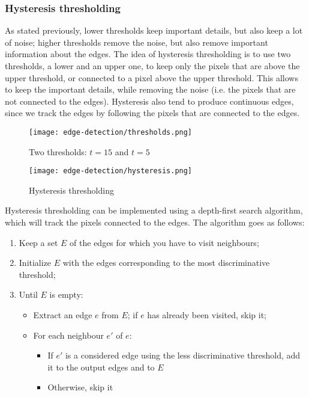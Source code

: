\subsubsection{Hysteresis thresholding}
As stated previously, lower thresholds keep important details, but also keep a lot of noise; higher thresholds remove the noise, but also remove important information about the edges. The idea of hysteresis thresholding is to use two thresholds, a lower and an upper one, to keep only the pixels that are above the upper threshold, or connected to a pixel above the upper threshold. This allows to keep the important details, while removing the noise (i.e. the pixels that are not connected to the edges). Hysteresis also tend to produce continuous edges, since we track the edges by following the pixels that are connected to the edges.
\begin{figure}[H]
    \centering
    \begin{minipage}{.6\textwidth}
        \centering
        \texttt{[image: edge-detection/thresholds.png]}
        \caption*{Two thresholds: $t=15$ and $t=5$}
    \end{minipage}
    \begin{minipage}{.3\textwidth}
        \centering
        \texttt{[image: edge-detection/hysteresis.png]}
        \caption*{Hysteresis thresholding}
    \end{minipage}
\end{figure}

Hysteresis thresholding can be implemented using a depth-first search algorithm, which will track the pixels connected to the edges. The algorithm goes as follows:
\begin{enumerate}
    \item Keep a set $E$ of the edges for which you have to visit neighbours;
    \item Initialize $E$ with the edges corresponding to the most discriminative threshold;
    \item Until $E$ is empty:
    \begin{itemize}
        \item Extract an edge $e$ from $E$; if $e$ has already been visited, skip it;
        \item For each neighbour $e'$ of $e$:
        \begin{itemize}
            \item If $e'$ is a considered edge using the less discriminative threshold, add it to the output edges and to $E$
            \item Otherwise, skip it
        \end{itemize}
    \end{itemize}
\end{enumerate}

